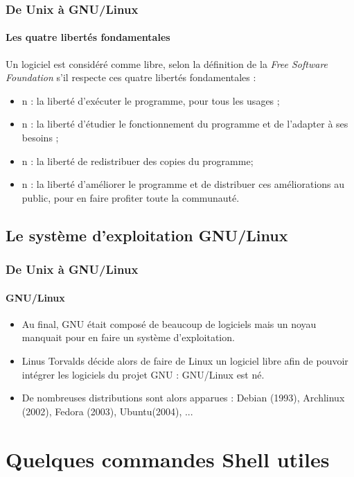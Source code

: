 \documentclass{beamer}
\begin{document}
            \begin{frame}
                \frametitle{De Unix à GNU/Linux}
                \framesubtitle{Les quatre libertés fondamentales}
                Un logiciel est considéré comme libre, selon la définition de la \textit{Free Software Foundation} s'il respecte ces quatre libertés fondamentales :
                \begin{itemize}
                    \item n : la liberté d'exécuter le programme, pour tous les usages ;
                    \item n : la liberté d'étudier le fonctionnement du programme et de l'adapter à ses besoins ;
                    \item n : la liberté de redistribuer des copies du programme;
                    \item n : la liberté d'améliorer le programme et de distribuer ces améliorations au public, pour en faire profiter toute la communauté.
                \end{itemize}
            \end{frame}
        
       \subsection[Le système d'exploitation GNU/Linux]{Le système d'exploitation GNU/Linux}
        
            \begin{frame}
                \frametitle{De Unix à GNU/Linux}
                \framesubtitle{GNU/Linux}
                \begin{itemize}
                    \item Au final, GNU était composé de beaucoup de logiciels mais un noyau manquait pour en faire un système d'exploitation.
                    \item Linus Torvalds décide alors de faire de Linux un logiciel libre afin de pouvoir intégrer les logiciels du projet GNU : GNU/Linux est né.
                    \item De nombreuses distributions sont alors apparues : Debian (1993), Archlinux (2002), Fedora (2003), Ubuntu(2004), ...
                \end{itemize}
            \end{frame}
    
    \section[Quelques commandes Shell utiles]{Quelques commandes Shell utiles}
    
\end{document}
